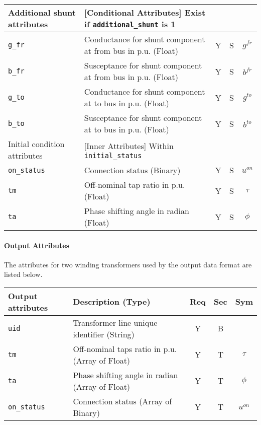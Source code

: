 \documentclass{article}
\begin{document}
  
  
\begin{center}
\small
\begin{tabular}{ l | l | c | c | c |}
  Additional shunt attributes & [Conditional Attributes] Exist if {\tt additional\_shunt} is 1 &  & & \\
  \hline
  {\tt g\_fr} & Conductance for shunt component at from bus in p.u. (Float)& Y & S & $g^{fr}$\\
  {\tt b\_fr} & Susceptance for shunt component at from bus in p.u. (Float)& Y & S & $b^{fr}$\\
  {\tt g\_to} & Conductance for shunt component at to bus in p.u. (Float)& Y & S & $g^{to}$\\
  {\tt b\_to} & Susceptance for shunt component at to bus in p.u. (Float)& Y & S & $b^{to}$\\
  \hline
  Initial condition attributes & [Inner Attributes] Within {\tt initial\_status} & & & \\
  \hline
  {\tt on\_status} & Connection status (Binary) & Y & S & $u^{on}$ \\
  {\tt tm} & Off-nominal tap ratio in p.u. (Float)& Y & S & $\tau$\\
  {\tt ta} & Phase shifting angle in radian (Float)& Y & S & $\phi$\\
  \hline
\end{tabular}
\end{center}


\paragraph{Output Attributes}
The attributes for two winding transformers used by the output data format are listed below.
\begin{center}
\small
\begin{tabular}{ l | l | c | c | c |}
Output attributes & Description (Type)& Req & Sec & Sym\\
\hline
 {\tt uid} & Transformer line unique identifier (String)& Y & B & \\
 {\tt tm} & Off-nominal taps ratio in p.u. (Array of Float)& Y & T & $\tau$\\
 {\tt ta} & Phase shifting angle in radian (Array of Float)& Y & T & $\phi$\\
 {\tt on\_status}     & Connection status (Array of Binary) & Y & T & $u^{on}$ \\
\hline
\end{tabular}
\end{center}
\end{document}
